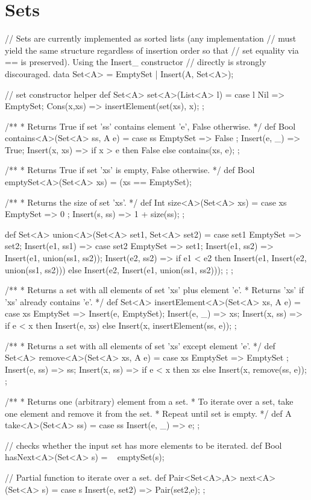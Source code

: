 \section{Sets}

\begin{abscode}
// Sets are currently implemented as sorted lists (any implementation
// must yield the same structure regardless of insertion order so that
// set equality via == is preserved).  Using the Insert_ constructor
// directly is strongly discouraged.
data Set<A> = EmptySet | Insert(A, Set<A>);

// set constructor helper
def Set<A> set<A>(List<A> l) = 
    case l { 
       Nil => EmptySet; 
       Cons(x,xs) => insertElement(set(xs), x);
    };

/**
 * Returns True if set 'ss' contains element 'e', False otherwise.
 */
def Bool contains<A>(Set<A> ss, A e) =
  case ss {
    EmptySet => False ;
    Insert(e, _) => True;
    Insert(x, xs) => if x > e then False else contains(xs, e);
  };
  
/**
 * Returns True if set 'xs' is empty, False  otherwise.
 */
def Bool emptySet<A>(Set<A> xs) = (xs == EmptySet); 

/**
 * Returns the size of set 'xs'.
 */
def Int size<A>(Set<A> xs) = 
   case xs {
      EmptySet => 0 ; 
      Insert(s, ss) => 1 + size(ss); 
   };

def Set<A> union<A>(Set<A> set1, Set<A> set2) =
   case set1 {
      EmptySet => set2;
      Insert(e1, ss1) =>  case set2 {
          EmptySet => set1;
          Insert(e1, ss2) => Insert(e1, union(ss1, ss2));
          Insert(e2, ss2) =>
            if e1 < e2
            then Insert(e1, Insert(e2, union(ss1, ss2)))
            else Insert(e2, Insert(e1, union(ss1, ss2)));
      };
   }; 

/**
 * Returns a set with all elements of set 'xs' plus element 'e'.
 * Returns 'xs' if 'xs' already contains 'e'.
 */
def Set<A> insertElement<A>(Set<A> xs, A e) =
  case xs {
      EmptySet => Insert(e, EmptySet);
      Insert(e, _) => xs;
      Insert(x, ss) => if e < x then Insert(e, xs) else Insert(x, insertElement(ss, e));
  };


/**
 * Returns a set with all elements of set 'xs' except element 'e'.
 */
def Set<A> remove<A>(Set<A> xs, A e) = 
  case xs {
     EmptySet => EmptySet ;
     Insert(e, ss) => ss;
     Insert(x, ss) => if e < x then xs else Insert(x, remove(ss, e));
  };

/**
 * Returns one (arbitrary) element from a set.
 * To iterate over a set, take one element and remove it from the set.
 * Repeat until set is empty.
 */
def A take<A>(Set<A> ss) =
  case ss {
    Insert(e, _) => e;
  };

// checks whether the input set has more elements to be iterated.
def Bool hasNext<A>(Set<A> s) = ~ emptySet(s); 

// Partial function to iterate over a set.
def Pair<Set<A>,A> next<A>(Set<A> s) = 
   case s { 
      Insert(e, set2) => Pair(set2,e); 
   };
\end{abscode}

